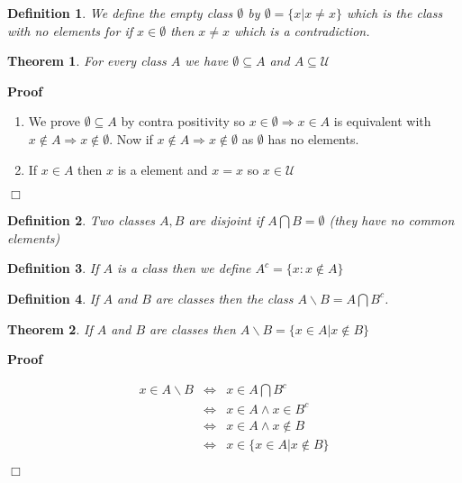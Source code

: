 \documentclass{book}
\newcommand{\nin}{\not\in}
\newcommand{\nobracket}{}
\newenvironment{proof}{\noindent\textbf{Proof\ }}{\hspace*{\fill}$\Box$\medskip}
\newtheorem{definition}{Definition}
{\theorembodyfont{\rmfamily}\newtheorem{example}{Example}}
\newtheorem{theorem}{Theorem}
\begin{document}
{{\begin{definition}
  {\index{$\emptyset$}}We define the empty class $\emptyset$ by $\emptyset =
  \{ x | x \neq x \nobracket \}$ which is the class with no elements for if $x
  \in \emptyset$ then $x \neq x$ which is a contradiction.
\end{definition}

\begin{theorem}
  For every class $A$ we have $\emptyset \subseteq A$ and $A \subseteq
  \mathcal{U}$
\end{theorem}

\begin{proof}
  
  \begin{enumerate}
    \item We prove $\emptyset \subseteq A$ by contra positivity so $x \in
    \emptyset \Rightarrow x \in A$ is equivalent with $x \nin A \Rightarrow x
    \nin \emptyset$. Now if $x \nin A \Rightarrow x \nin \emptyset$ as
    $\emptyset$ has no elements.
    
    \item If $x \in A$ then $x$ is a element and $x = x$ so $x \in
    \mathcal{U}$
  \end{enumerate}
\end{proof}

\begin{definition}
  Two classes $A, B$ are disjoint if $A \bigcap B = \emptyset$ (they have no
  common elements)
\end{definition}

\begin{definition}
  {}If $A$ is a class then we define $A^c = \{ x : x \nin A \}$
\end{definition}

\begin{definition}
  If $A$ and $B$ are classes then the class $A \backslash B = A \bigcap B^c$.
\end{definition}

\begin{theorem}
  If $A$ and $B$ are classes then $A \backslash B = \{ x \in A | x \nin B
  \nobracket \}$
\end{theorem}

\begin{proof}
  
  \begin{eqnarray*}
    x \in A \backslash B & \Leftrightarrow & x \in A \bigcap B^c\\
    & \Leftrightarrow & x \in A \wedge x \in B^c\\
    & \Leftrightarrow & x \in A \wedge x \nin B\\
    & \Leftrightarrow & x \in \{ x \in A | x \nin B \nobracket \}
  \end{eqnarray*}
  

\end{proof}}}
\end{document}
